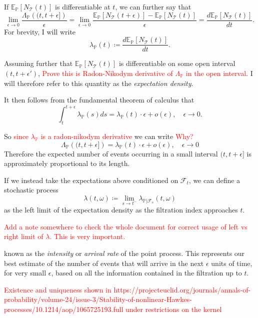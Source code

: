 \documentclass[honours,12pt]{unswthesis}
\numberwithin{equation}{section}
\begin{document}
If $\mathbb{E}_\mathbb{P}\left[N_\mathcal{T}(t)\right]$ is differentiable at $t$, we can further say that
$$\lim_{\epsilon\to0}\frac{\Lambda_\mathbb{P}\left((t,t+\epsilon]\right)}{\epsilon} = \lim_{\epsilon\to0}\frac{\mathbb{E}_\mathbb{P}\left[N_\mathcal{T}(t+\epsilon)\right] - \mathbb{E}_\mathbb{P}\left[N_\mathcal{T}(t)\right]}{\epsilon} = \frac{d\mathbb{E}_\mathbb{P}\left[N_\mathcal{T}(t)\right]}{dt}.$$
For brevity, I will write
$$\lambda_{\mathbb{P}}(t) \coloneq \frac{d\mathbb{E}_\mathbb{P}\left[N_\mathcal{T}(t)\right]}{dt}.$$

Assuming further that $\mathbb{E}_\mathbb{P}\left[N_\mathcal{T}(t)\right]$ is differentiable on some open interval $(t,t+\epsilon')$, \textcolor{red}{Prove this is Radon-Nikodym derivative of $\Lambda_\mathbb{P}$ in the open interval}. I will therefore refer to this quantity as the \textit{expectation density}.

It then follows from the fundamental theorem of calculus that
$$\int_t^{t+\epsilon} \lambda_{\mathbb{P}}(s)ds = \lambda_{\mathbb{P}}(t)\cdot\epsilon + o(\epsilon),\quad \epsilon\to 0.$$

So \textcolor{red}{since $\lambda_\mathbb{P}$ is a radon-nikodym derivative} we can write \textcolor{red}{Why?}
$$\Lambda_{\mathbb{P}}\left((t,t+\epsilon]\right)=\lambda_{\mathbb{P}}(t)\cdot\epsilon+o(\epsilon),\quad \epsilon\to 0$$
Therefore the expected number of events occurring in a small interval $(t,t+\epsilon]$ is approximately proportional to its length.

If we instead take the expectations above conditioned on $\mathcal{F}_t$, we can define a stochastic process
$$\lambda(t,\omega) \coloneq \lim_{s\to t^-}\lambda_{\mathbb{P}\vert\mathcal{F}_s}(t,\omega)$$
as the left limit of the expectation density as the filtration index approaches $t$.

\textcolor{red}{Add a note somewhere to check the whole document for correct usage of left vs right limit of $\lambda$. This is very important.}

known as the \textit{intensity} or \textit{arrival rate} of the point process. This represents our best estimate of the number of events that will arrive in the next $\epsilon$ units of time, for very small $\epsilon$, based on all the information contained in the filtration up to $t$.

\textcolor{red}{Existence and uniqueness shown in https://projecteuclid.org/journals/annals-of-probability/volume-24/issue-3/Stability-of-nonlinear-Hawkes-processes/10.1214/aop/1065725193.full under restrictions on the kernel}
\end{document}
